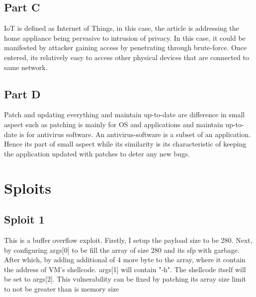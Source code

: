 \documentclass[12pt]{article}
\begin{document}
\subsection*{Part C}
IoT is defined as Internet of Things, in this case, the article is addressing the home appliance being pervasive to intrusion of privacy. In this case, it could be manifested by attacker gaining access by penetrating through brute-force. Once entered, its relatively easy to access other physical devices that are connected to same network. 

\subsection*{Part D}
Patch and updating everything and maintain up-to-date are difference in small aspect such as patching is mainly for OS and applications and maintain up-to-date is for antivirus software. An antivirus-software is a subset of an application. Hence its part of small aspect while its similarity is its characteristic of keeping the application updated with patches to deter any new bugs. 

\section*{Sploits}
\subsection*{Sploit 1}
This is a buffer overflow exploit. Firstly, I setup the payload size to be 280. Next, by configuring args[0] to be fill the array of size 280 and its sfp with garbage. After which, by adding additional of 4 more byte to the array, where it contain the address of VM's shellcode. args[1] will contain "-h". The shellcode itself will be set to args[2].  This vulnerability can be fixed by patching its array size limit to not be greater than is memory size
\end{document}
